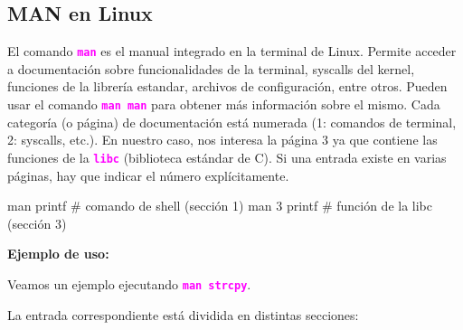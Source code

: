 \documentclass[]{scrartcl}
\newcommand{\hl}[1]{\textcolor{magenta}{\textbf{\texttt{#1}}}}
\begin{document}
\subsection*{MAN en Linux}

El comando \hl{man} es el manual integrado en la terminal de Linux.
Permite acceder a documentación sobre funcionalidades de la terminal, syscalls del kernel, funciones de la librería estandar, archivos de configuración, entre otros.
Pueden usar el comando \hl{man man} para obtener más información sobre el mismo.
Cada categoría (o página) de documentación está numerada (1: comandos de terminal, 2: syscalls, etc.). En nuestro caso, nos interesa la página 3 ya que contiene las funciones de la \hl{libc} (biblioteca estándar de C).
Si una entrada existe en varias páginas, hay que indicar el número explícitamente.
\begin{bashbox}[]
  man printf    # comando de shell (sección 1)
  man 3 printf  # función de la libc (sección 3)
\end{bashbox}


\textbf{Ejemplo de uso:}

Veamos un ejemplo ejecutando \hl{man strcpy}.

La entrada correspondiente está dividida en distintas secciones:
\end{document}
